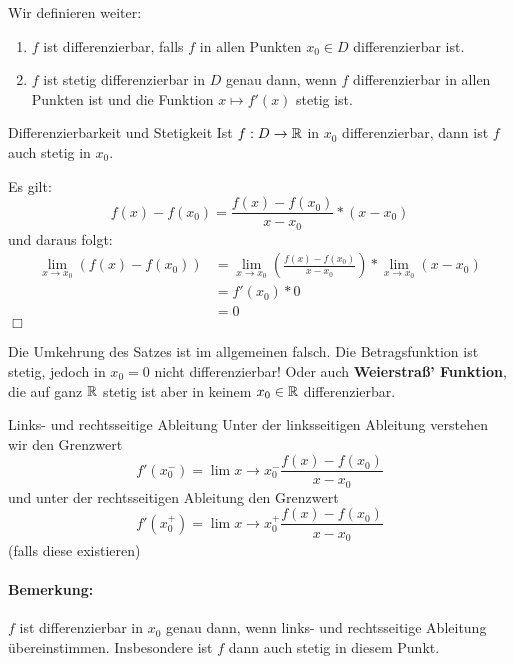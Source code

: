 Wir definieren weiter:
\begin{definition}{}
	\begin{enumerate}
		\item $f$ ist differenzierbar, falls $f$ in allen Punkten $x_0\in D$ differenzierbar ist.
		\item $f$ ist stetig differenzierbar in $D$ genau dann, wenn $f$ differenzierbar in allen Punkten ist und die Funktion $x\mapsto f'(x)$ stetig ist.
	\end{enumerate}
\end{definition}
\begin{satz}{Differenzierbarkeit und Stetigkeit}
	Ist $f:D\rightarrow\mathbb{R}$ in $x_0$ differenzierbar, dann ist $f$ auch stetig in $x_0$.
\end{satz}
\beweis
Es gilt:
\begin{equation*}
	f(x)-f(x_0)=\frac{f(x)-f(x_0)}{x-x_0}*(x-x_0)
\end{equation*}
und daraus folgt:
\begin{align*}
	\lim\limits_{x\to x_0}(f(x)-f(x_0)) &= \lim\limits_{x\to x_0}\left(\frac{f(x)-f(x_0)}{x-x_0}\right)*\lim\limits_{x\to x_0}(x-x_0)\\
	&=f'(x_0)*0\\
	&=0
\end{align*}
\hfill$\Box$

Die Umkehrung des Satzes ist im allgemeinen falsch. Die Betragsfunktion ist stetig, jedoch in $x_0=0$ nicht differenzierbar!
Oder auch \textbf{Weierstraß' Funktion}, die auf ganz $\mathbb{R}$ stetig ist aber in keinem $x_0\in\mathbb{R}$ differenzierbar.

\begin{definition}{Links- und rechtsseitige Ableitung}
	Unter der linksseitigen Ableitung verstehen wir den Grenzwert
	\begin{equation*}
		f'(x_0^-)=\lim\limits{x\to x_0^-}\frac{f(x)-f(x_0)}{x-x_0}
	\end{equation*}
	und unter der rechtsseitigen Ableitung den Grenzwert
	\begin{equation*}
		f'(x_0^+)=\lim\limits{x\to x_0^+}\frac{f(x)-f(x_0)}{x-x_0}
	\end{equation*}
	(falls diese existieren)
\end{definition}
\paragraph{Bemerkung:}
$f$ ist differenzierbar in $x_0$ genau dann, wenn links- und rechtsseitige Ableitung übereinstimmen. Insbesondere ist $f$ dann auch stetig in diesem Punkt.

